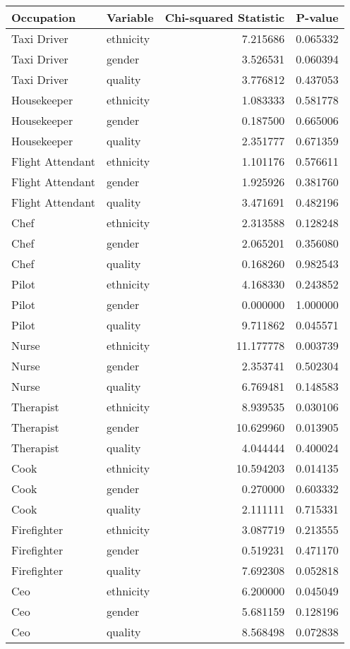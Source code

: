 \begin{tabular}{llrr}
\toprule
Occupation & Variable & Chi-squared Statistic & P-value \\
\midrule
Taxi Driver  & ethnicity & 7.215686 & 0.065332 \\
Taxi Driver  & gender & 3.526531 & 0.060394 \\
Taxi Driver  & quality & 3.776812 & 0.437053 \\
Housekeeper  & ethnicity & 1.083333 & 0.581778 \\
Housekeeper  & gender & 0.187500 & 0.665006 \\
Housekeeper  & quality & 2.351777 & 0.671359 \\
Flight Attendant  & ethnicity & 1.101176 & 0.576611 \\
Flight Attendant  & gender & 1.925926 & 0.381760 \\
Flight Attendant  & quality & 3.471691 & 0.482196 \\
Chef  & ethnicity & 2.313588 & 0.128248 \\
Chef  & gender & 2.065201 & 0.356080 \\
Chef  & quality & 0.168260 & 0.982543 \\
Pilot   & ethnicity & 4.168330 & 0.243852 \\
Pilot   & gender & 0.000000 & 1.000000 \\
Pilot   & quality & 9.711862 & 0.045571 \\
Nurse   & ethnicity & 11.177778 & 0.003739 \\
Nurse   & gender & 2.353741 & 0.502304 \\
Nurse   & quality & 6.769481 & 0.148583 \\
Therapist  & ethnicity & 8.939535 & 0.030106 \\
Therapist  & gender & 10.629960 & 0.013905 \\
Therapist  & quality & 4.044444 & 0.400024 \\
Cook  & ethnicity & 10.594203 & 0.014135 \\
Cook  & gender & 0.270000 & 0.603332 \\
Cook  & quality & 2.111111 & 0.715331 \\
Firefighter  & ethnicity & 3.087719 & 0.213555 \\
Firefighter  & gender & 0.519231 & 0.471170 \\
Firefighter  & quality & 7.692308 & 0.052818 \\
Ceo  & ethnicity & 6.200000 & 0.045049 \\
Ceo  & gender & 5.681159 & 0.128196 \\
Ceo  & quality & 8.568498 & 0.072838 \\
\bottomrule
\end{tabular}
